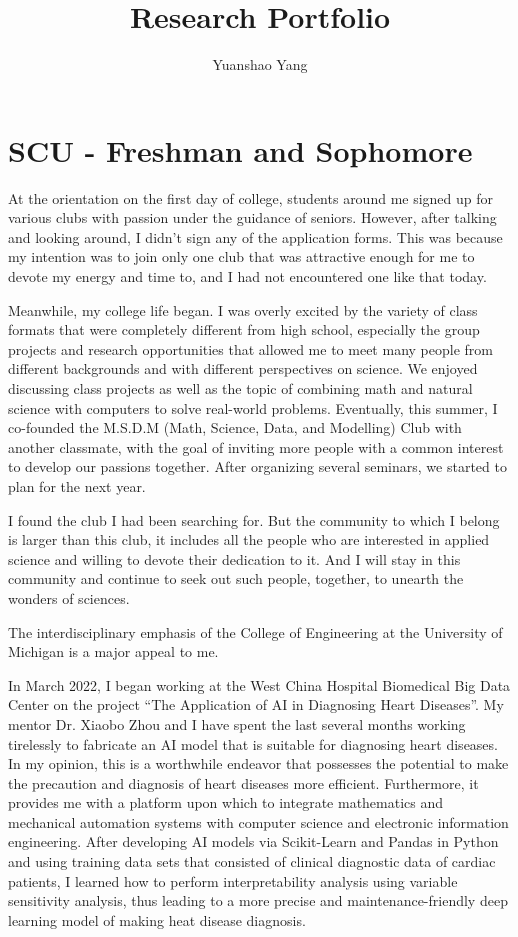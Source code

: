 \documentclass[12pt]{article}
\title{Research Portfolio}
\author{Yuanshao Yang}
\date{}
\begin{document}
\maketitle

\section{SCU - Freshman and Sophomore}
At the orientation on the first day of college, students around me signed up for various clubs with passion under the guidance of seniors. However, after talking and looking around, I didn’t sign any of the application forms. This was because my intention was to join only one club that was attractive enough for me to devote my energy and time to, and I had not encountered one like that today. 

Meanwhile, my college life began. I was overly excited by the variety of class formats that were completely different from high school, especially the group projects and research opportunities that allowed me to meet many people from different backgrounds and with different perspectives on science. We enjoyed discussing class projects as well as the topic of combining math and natural science with computers to solve real-world problems. Eventually, this summer, I co-founded the M.S.D.M (Math, Science, Data, and Modelling) Club with another classmate, with the goal of inviting more people with a common interest to develop our passions together. After organizing several seminars, we started to plan for the next year. 

I found the club I had been searching for. But the community to which I belong is larger than this club, it includes all the people who are interested in applied science and willing to devote their dedication to it. And I will stay in this community and continue to seek out such people, together, to unearth the wonders of sciences.

The interdisciplinary emphasis of the College of Engineering at the University of Michigan is a major appeal to me.

In March 2022, I began working at the West China Hospital Biomedical Big Data Center on the project “The Application of AI in Diagnosing Heart Diseases”. My mentor Dr. Xiaobo Zhou and I have spent the last several months working tirelessly to fabricate an AI model that is suitable for diagnosing heart diseases. In my opinion, this is a worthwhile endeavor that possesses the potential to make the precaution and diagnosis of heart diseases more efficient. Furthermore, it provides me with a platform upon which to integrate mathematics and mechanical automation systems with computer science and electronic information engineering. After developing AI models via Scikit-Learn and Pandas in Python and using training data sets that consisted of clinical diagnostic data of cardiac patients, I learned how to perform interpretability analysis using variable sensitivity analysis, thus leading to a more precise and maintenance-friendly deep learning model of making heat disease diagnosis.
\end{document}
